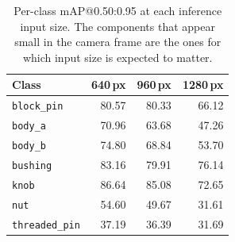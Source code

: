 \begin{table}[htbp]
\centering
\caption{Per-class mAP@0.50:0.95 at each inference input size. The components that appear small in the camera frame are the ones for which input size is expected to matter.}
\label{tab:resolution-per-class}
\begin{tabular}{|l|r|r|r|}
\hline
\textbf{Class} & \textbf{640\,px} & \textbf{960\,px} & \textbf{1280\,px} \\
\hline
\texttt{block\_pin} & 80.57 & 80.33 & 66.12 \\
\hline
\texttt{body\_a} & 70.96 & 63.68 & 47.26 \\
\hline
\texttt{body\_b} & 74.80 & 68.84 & 53.70 \\
\hline
\texttt{bushing} & 83.16 & 79.91 & 76.14 \\
\hline
\texttt{knob} & 86.64 & 85.08 & 72.65 \\
\hline
\texttt{nut} & 54.60 & 49.67 & 31.61 \\
\hline
\texttt{threaded\_pin} & 37.19 & 36.39 & 31.69 \\
\hline
\end{tabular}
\end{table}
